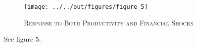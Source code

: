 \begin{figure}[t]
    
    \centering

    \texttt{[image: ../../out/figures/figure\_5]}

    \caption{\textsc{Response to Both Productivity and Financial Shocks}}
    
    \label{fig:figure_5}

\end{figure}

See figure 5.